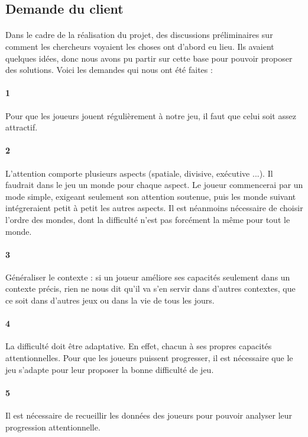 \subsection{Demande du client}

\paragraph{}Dans le cadre de la réalisation du projet, des discussions préliminaires sur comment les chercheurs voyaient les choses ont d'abord eu lieu. Ils avaient quelques idées,
donc nous avons pu partir sur cette base pour pouvoir proposer des solutions. Voici les demandes qui nous ont été faites :


\paragraph{1}Pour que les joueurs jouent régulièrement à notre jeu, il faut que celui soit assez attractif.
\paragraph{2}L'attention comporte plusieurs aspects (spatiale, divisive, exécutive ...). Il faudrait dans le jeu un monde pour chaque aspect. Le joueur commencerai par un mode simple,
exigeant seulement son attention soutenue, puis les monde suivant intégreraient petit à petit les autres aspects. Il est néanmoins nécessaire de choisir l'ordre des mondes, dont la
difficulté n'est pas forcément la même pour tout le monde.
\paragraph{3}Généraliser le contexte : si un joueur améliore ses capacités seulement dans un contexte précis, rien ne nous dit qu'il va s'en servir dans d'autres contextes, que ce soit
dans d'autres jeux ou dans la vie de tous les jours.
\paragraph{4}La difficulté doit être adaptative. En effet, chacun à ses propres capacités attentionnelles. Pour que les joueurs puissent progresser, il est nécessaire que le jeu s'adapte pour
leur proposer la bonne difficulté de jeu.
\paragraph{5}Il est nécessaire de recueillir les données des joueurs pour pouvoir analyser leur progression attentionnelle.
